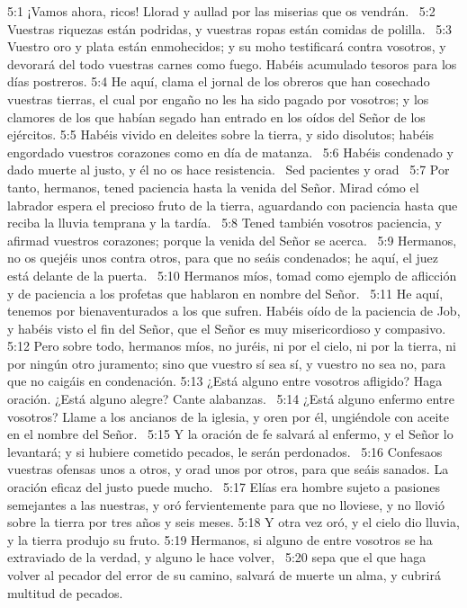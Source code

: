 5:1 ¡Vamos ahora, ricos! Llorad y aullad por las miserias que os vendrán.  
5:2 Vuestras riquezas están podridas, y vuestras ropas están comidas de polilla.  
5:3 Vuestro oro y plata están enmohecidos; y su moho testificará contra vosotros, y devorará del todo vuestras carnes como fuego. Habéis acumulado tesoros para los días postreros. 
5:4 He aquí, clama el jornal de los obreros que han cosechado vuestras tierras, el cual por engaño no les ha sido pagado por vosotros; y los clamores de los que habían segado han entrado en los oídos del Señor de los ejércitos. 
5:5 Habéis vivido en deleites sobre la tierra, y sido disolutos; habéis engordado vuestros corazones como en día de matanza.  
5:6 Habéis condenado y dado muerte al justo, y él no os hace resistencia.  
Sed pacientes y orad  
5:7 Por tanto, hermanos, tened paciencia hasta la venida del Señor. Mirad cómo el labrador espera el precioso fruto de la tierra, aguardando con paciencia hasta que reciba la lluvia temprana y la tardía.  
5:8 Tened también vosotros paciencia, y afirmad vuestros corazones; porque la venida del Señor se acerca.  
5:9 Hermanos, no os quejéis unos contra otros, para que no seáis condenados; he aquí, el juez está delante de la puerta.  
5:10 Hermanos míos, tomad como ejemplo de aflicción y de paciencia a los profetas que hablaron en nombre del Señor.  
5:11 He aquí, tenemos por bienaventurados a los que sufren. Habéis oído de la paciencia de Job, y habéis visto el fin del Señor, que el Señor es muy misericordioso y compasivo. 
5:12 Pero sobre todo, hermanos míos, no juréis, ni por el cielo, ni por la tierra, ni por ningún otro juramento; sino que vuestro sí sea sí, y vuestro no sea no, para que no caigáis en condenación. 
5:13 ¿Está alguno entre vosotros afligido? Haga oración. ¿Está alguno alegre? Cante alabanzas.  
5:14 ¿Está alguno enfermo entre vosotros? Llame a los ancianos de la iglesia, y oren por él, ungiéndole con aceite en el nombre del Señor.  
5:15 Y la oración de fe salvará al enfermo, y el Señor lo levantará; y si hubiere cometido pecados, le serán perdonados.  
5:16 Confesaos vuestras ofensas unos a otros, y orad unos por otros, para que seáis sanados. La oración eficaz del justo puede mucho.  
5:17 Elías era hombre sujeto a pasiones semejantes a las nuestras, y oró fervientemente para que no lloviese, y no llovió sobre la tierra por tres años y seis meses. 
5:18 Y otra vez oró, y el cielo dio lluvia, y la tierra produjo su fruto. 
5:19 Hermanos, si alguno de entre vosotros se ha extraviado de la verdad, y alguno le hace volver,  
5:20 sepa que el que haga volver al pecador del error de su camino, salvará de muerte un alma, y cubrirá multitud de pecados.